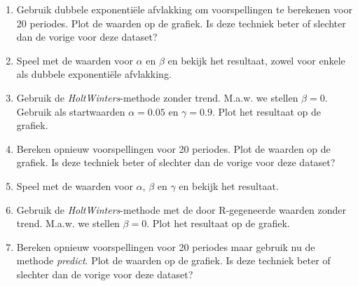 \begin{exercise}
\begin{enumerate}
  \item Gebruik dubbele exponentiële afvlakking om voorspellingen te berekenen voor 20 periodes. Plot de waarden op de grafiek. Is deze techniek beter of slechter dan de vorige voor deze dataset?
  \item Speel met de waarden voor $\alpha$ en $\beta$ en bekijk het resultaat, zowel voor enkele als dubbele exponentiële afvlakking.
  \item Gebruik de \emph{HoltWinters}-methode zonder trend.  M.a.w. we stellen $\beta=0$. Gebruik als startwaarden $\alpha =  0.05$ en $\gamma = 0.9$. Plot het resultaat op de grafiek.
  \item Bereken opnieuw voorspellingen voor 20 periodes. Plot de waarden op de grafiek. Is deze techniek beter of slechter dan de vorige voor deze dataset?
  \item Speel met de waarden voor $\alpha$, $\beta$ en $\gamma$ en bekijk het resultaat.
  \item Gebruik de \emph{HoltWinters}-methode met de door R-gegeneerde waarden zonder trend.  M.a.w. we stellen $\beta=0$.  Plot het resultaat op de grafiek.
  \item Bereken opnieuw voorspellingen voor 20 periodes maar gebruik nu de methode \emph{predict}. Plot de waarden op de grafiek. Is deze techniek beter of slechter dan de vorige voor deze dataset?
\end{enumerate}	
\end{exercise}

